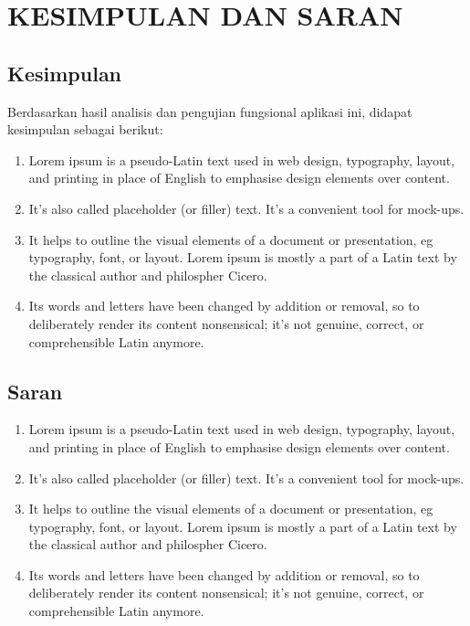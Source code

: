 
\chapter{KESIMPULAN DAN SARAN}

\section{Kesimpulan}
	Berdasarkan hasil analisis dan pengujian fungsional aplikasi ini, didapat kesimpulan sebagai berikut:

	\begin{enumerate}
		\item Lorem ipsum is a pseudo-Latin text used in web design, typography, layout, and printing in place of English to emphasise design elements over content. 
		
		\item It's also called placeholder (or filler) text. It's a convenient tool for mock-ups. 
		
		\item It helps to outline the visual elements of a document or presentation, eg typography, font, or layout. Lorem ipsum is mostly a part of a Latin text by the classical author and philospher Cicero.

		\item Its words and letters have been changed by addition or removal, so to deliberately render its content nonsensical; it's not genuine, correct, or comprehensible Latin anymore. 
	\end{enumerate}


\section{Saran}
	\begin{enumerate}
		\item Lorem ipsum is a pseudo-Latin text used in web design, typography, layout, and printing in place of English to emphasise design elements over content. 
		
		\item It's also called placeholder (or filler) text. It's a convenient tool for mock-ups. 
		
		\item It helps to outline the visual elements of a document or presentation, eg typography, font, or layout. Lorem ipsum is mostly a part of a Latin text by the classical author and philospher Cicero.

		\item Its words and letters have been changed by addition or removal, so to deliberately render its content nonsensical; it's not genuine, correct, or comprehensible Latin anymore. 
	\end{enumerate}

	
\begin{comment}

\end{comment}
